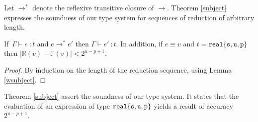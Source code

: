 Let $\rightarrow^*$ denote the reflexive transitive closure of $\rightarrow$.
Theorem \ref{subject} expresses the soundness of our type system for sequences of reduction
of arbitrary length.

\begin{theorem}
\label{subject}
If\ $\Gamma \vdash e\ : t$ and $e\rightarrow^* e'$ then $\Gamma \vdash e'\ : t$. In addition,
if $e\equiv v$ and $t=\mathtt{real\{s,u,p\}}$ then $|\mathbb{R}(v)-\mathbb{F}(v)|< 2^{u-p+1}$.
\end{theorem} 

\begin{proof}
By induction on the length of the reduction sequence, using Lemma \ref{wsubject}.
\end{proof}

Theorem \ref{subject} assert the soundness of our type system. It states that the evaluation of an expression of type $\mathtt{real\{s,u,p\}}$ yields
a result of accuracy $2^{u-p+1}$.


